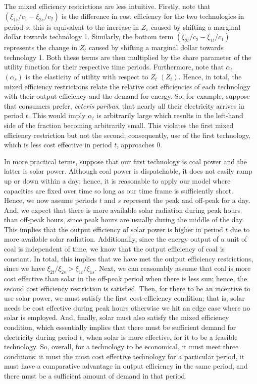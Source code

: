 \documentclass[11pt,a4paper,leqno]{extarticle}
\providecommand{\DIFadd}[1]{{\protect\color{blue}\uwave{#1}}} %
\providecommand{\DIFdel}[1]{{\protect\color{red}\sout{#1}}}                      %
\providecommand{\DIFaddbegin}{} %
\providecommand{\DIFaddend}{} %
\providecommand{\DIFdelbegin}{} %
\providecommand{\DIFdelend}{} %
\begin{document}
The mixed efficiency restrictions are less intuitive. Firstly, note that $\left(\xi_{1s}/c_1 - \xi_{2s}/c_2\right)$ is the difference in cost efficiency for the two technologies in period $s$; this is equivalent to the increase in $Z_s$ caused by shifting a marginal dollar towards technology 1. Similarly, the bottom term $\left( \xi_{2t}/c_2 - \xi_{1t}/c_1 \right)$ represents the change in $Z_t$ caused by shifting a marginal dollar towards technology 1. Both these terms are then multiplied by the share parameter of the utility function for their respective time periods. Furthermore, note that $\alpha_t$ $(\alpha_s)$ is the elasticity of utility with respect to $Z_t$ \DIFdelbegin \DIFdel{$(Z_t)$}\DIFdelend \DIFaddbegin \DIFadd{$(Z_s)$}\DIFaddend . Hence, in total, the mixed efficiency restrictions relate the relative cost efficiencies of each technology with their output efficiency and the demand for energy. So, for example, suppose that consumers prefer, \textit{ceteris paribus}, that nearly all their electricity arrives in period $t$. This would imply $\alpha_t$ is arbitrarily large which results in the left-hand side of the fraction becoming arbitrarily small. This violates the first mixed efficiency restriction but not the second; consequently, use of the first technology, which is less cost effective in period $t$, approaches $0$. 



In more practical terms, suppose that our first technology is coal power and the latter is solar power. Although coal power is dispatchable, it does not easily ramp up or down within a day; hence, it is reasonable to apply our model where capacities are fixed over time so long as our time frame is sufficiently short. Hence, we now assume periods $t$ and $s$ represent the peak and off-peak for a day. And, we expect that there is more available solar radiation during peak hours than off-peak hours, since peak hours are usually during the middle of the day. This implies that the output efficiency of solar power is higher in period $t$ due to more available solar radiation. Additionally, since the energy output of a unit of coal is independent of time, we know that the output efficiency of coal is constant. In total, this implies that we have met the output efficiency restrictions, since we have $\xi_{2t}/\xi_{2s} > \xi_{1t}/\xi_{1s}$. Next, we can reasonably assume that coal is more cost effective than solar in the off-peak period when there is less sun; hence, the second cost efficiency restriction is satisfied. Then, for there to be an incentive to use solar power, we must satisfy the first cost-efficiency condition; that is, solar needs be cost effective during peak hours otherwise we hit an edge case where no solar is employed. And, finally, solar must also satisfy the mixed efficiency condition, which essentially implies that there must be sufficient demand for electricity during period $t$, when solar is more effective, for it to be a feasible technology. So, overall, for a technology to be economical, it must meet three conditions: it must the most cost effective technology for a particular period, it must have a comparative advantage in output efficiency in the same period, and there must be a sufficient amount of demand in that period. 
\end{document}
